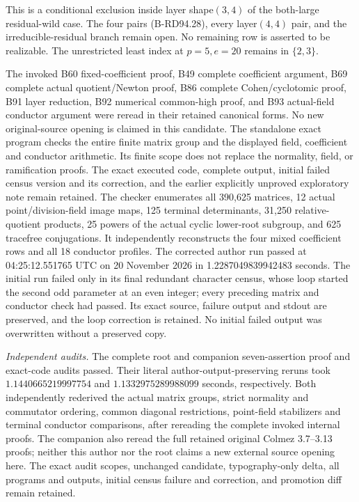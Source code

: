 \begin{remark}
\label{rem:B-RD94-scope}
This is a conditional exclusion inside layer shape$(3,4)$ of the
both-large residual-wild case. The four pairs (B-RD94.28), every
layer$(4,4)$ pair, and the irreducible-residual branch remain open.
No remaining row is asserted to be realizable. The unrestricted
least index at $p=5,e=20$ remains in $\{2,3\}$.

The invoked B60 fixed-coefficient proof, B49 complete coefficient
argument, B69 complete actual quotient/Newton proof, B86 complete
Cohen/cyclotomic proof, B91 layer reduction, B92 numerical
common-high proof, and B93 actual-field conductor argument were
reread in their retained canonical forms.
No new original-source opening is claimed in this candidate.
The standalone exact program
checks the entire finite matrix group and the displayed field,
coefficient and conductor arithmetic. Its finite scope does not
replace the normality, field, or ramification proofs. The exact
executed code, complete output, initial failed census version and
its correction, and the earlier explicitly unproved exploratory
note remain retained. The checker enumerates all 390,625 matrices,
12 actual point/division-field image maps, 125 terminal determinants,
31,250 relative-quotient products, 25 powers of the actual cyclic
lower-root subgroup, and 625 tracefree conjugations. It independently
reconstructs the four mixed coefficient rows and all 18 conductor
profiles. The corrected author run passed at 04:25:12.551765 UTC
on 20 November 2026 in 1.2287049839942483 seconds. The initial run
failed only in its final redundant character census, whose loop
started the second odd parameter at an even integer; every preceding
matrix and conductor check had passed. Its exact source, failure
output and stdout are preserved, and the loop correction is retained.
No initial failed output was overwritten without a preserved copy.

\smallskip
\noindent\emph{Independent audits.}
The complete root and companion seven-assertion proof and exact-code
audits passed. Their literal author-output-preserving reruns took
\(1.1440665219997754\) and \(1.1332975289988099\) seconds, respectively.
Both independently rederived the actual matrix groups, strict
normality and commutator ordering, common diagonal restrictions,
point-field stabilizers and terminal conductor comparisons, after
rereading the complete invoked internal proofs. The companion also
reread the full retained original Colmez 3.7--3.13 proofs; neither
this author nor the root claims a new external source opening here.
The exact audit scopes, unchanged candidate, typography-only delta,
all programs and outputs, initial census failure and correction,
and promotion diff remain retained.
\end{remark}
